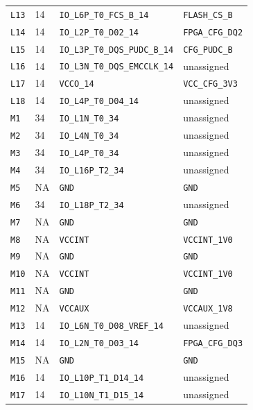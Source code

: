\documentclass[11pt,a4paper]{article}
\begin{document}
\begin{longtable}{@{}P{13mm}P{13mm}P{78mm}P{62mm}@{}}
\nolinkurl{L13} & 14 & \nolinkurl{IO_L6P_T0_FCS_B_14} & \nolinkurl{FLASH_CS_B} \\
\nolinkurl{L14} & 14 & \nolinkurl{IO_L2P_T0_D02_14} & \nolinkurl{FPGA_CFG_DQ2} \\
\nolinkurl{L15} & 14 & \nolinkurl{IO_L3P_T0_DQS_PUDC_B_14} & \nolinkurl{CFG_PUDC_B} \\
\nolinkurl{L16} & 14 & \nolinkurl{IO_L3N_T0_DQS_EMCCLK_14} & \textcolor{muted}{unassigned} \\
\nolinkurl{L17} & 14 & \nolinkurl{VCCO_14} & \nolinkurl{VCC_CFG_3V3} \\
\nolinkurl{L18} & 14 & \nolinkurl{IO_L4P_T0_D04_14} & \textcolor{muted}{unassigned} \\
\nolinkurl{M1} & 34 & \nolinkurl{IO_L1N_T0_34} & \textcolor{muted}{unassigned} \\
\nolinkurl{M2} & 34 & \nolinkurl{IO_L4N_T0_34} & \textcolor{muted}{unassigned} \\
\nolinkurl{M3} & 34 & \nolinkurl{IO_L4P_T0_34} & \textcolor{muted}{unassigned} \\
\nolinkurl{M4} & 34 & \nolinkurl{IO_L16P_T2_34} & \textcolor{muted}{unassigned} \\
\nolinkurl{M5} & NA & \nolinkurl{GND} & \nolinkurl{GND} \\
\nolinkurl{M6} & 34 & \nolinkurl{IO_L18P_T2_34} & \textcolor{muted}{unassigned} \\
\nolinkurl{M7} & NA & \nolinkurl{GND} & \nolinkurl{GND} \\
\nolinkurl{M8} & NA & \nolinkurl{VCCINT} & \nolinkurl{VCCINT_1V0} \\
\nolinkurl{M9} & NA & \nolinkurl{GND} & \nolinkurl{GND} \\
\nolinkurl{M10} & NA & \nolinkurl{VCCINT} & \nolinkurl{VCCINT_1V0} \\
\nolinkurl{M11} & NA & \nolinkurl{GND} & \nolinkurl{GND} \\
\nolinkurl{M12} & NA & \nolinkurl{VCCAUX} & \nolinkurl{VCCAUX_1V8} \\
\nolinkurl{M13} & 14 & \nolinkurl{IO_L6N_T0_D08_VREF_14} & \textcolor{muted}{unassigned} \\
\nolinkurl{M14} & 14 & \nolinkurl{IO_L2N_T0_D03_14} & \nolinkurl{FPGA_CFG_DQ3} \\
\nolinkurl{M15} & NA & \nolinkurl{GND} & \nolinkurl{GND} \\
\nolinkurl{M16} & 14 & \nolinkurl{IO_L10P_T1_D14_14} & \textcolor{muted}{unassigned} \\
\nolinkurl{M17} & 14 & \nolinkurl{IO_L10N_T1_D15_14} & \textcolor{muted}{unassigned} \\

\end{longtable}
\end{document}
